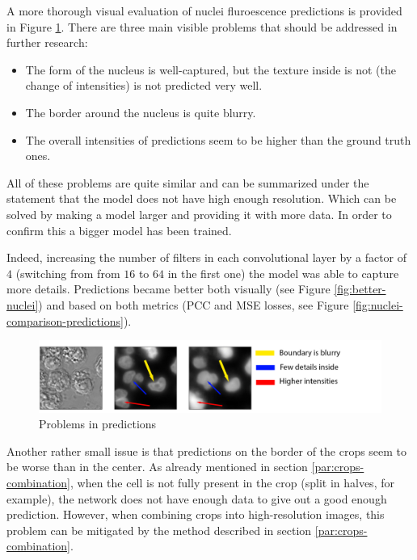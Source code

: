 A more thorough visual evaluation of nuclei fluroescence predictions is provided in Figure \ref{fig:nuclei-troubles}. There are three main visible problems that should be addressed in further research:
\begin{itemize}
	\item The form of the nucleus is well-captured, but the texture inside is not (the change of intensities) is not predicted very well.
	\item The border around the nucleus is quite blurry.
	\item The overall intensities of predictions seem to be higher than the ground truth ones.
\end{itemize}

All of these problems are quite similar and can be summarized under the statement that the model does not have high enough resolution. Which can be solved by making a model larger and providing it with more data. In order to confirm this a bigger model has been trained.

Indeed, increasing the number of filters in each convolutional layer by a factor of $4$ (switching from from $16$ to $64$ in the first one) the model was able to capture more details. Predictions became better both visually (see Figure \ref{fig:better-nuclei}) and based on both metrics (PCC and MSE losses, see Figure \ref{fig:nuclei-comparison-predictions}).

\begin{figure}[H]
	\begin{center}
		\includegraphics[width=0.8\linewidth]{bilder/nuclei/problems.png}
		\caption{Problems in predictions}\label{fig:nuclei-troubles}
	\end{center}
\end{figure}

Another rather small issue is that predictions on the border of the crops seem to be worse than in the center. As already mentioned in section \ref{par:crops-combination}, when the cell is not fully present in the crop (split in halves, for example), the network does not have enough data to give out a good enough prediction. However, when combining crops into high-resolution images, this problem can be mitigated by the method described in section \ref{par:crops-combination}.

